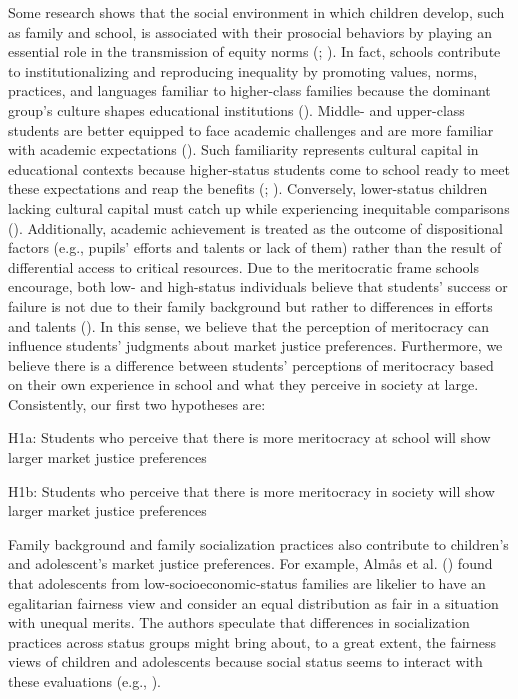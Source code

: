 \documentclass[
  letterpaper,
  DIV=11,
  numbers=noendperiod]{scrartcl}
\begin{document}
Some research shows that the social environment in which children
develop, such as family and school, is associated with their prosocial
behaviors by playing an essential role in the transmission of equity
norms (;
). In
fact, schools contribute to institutionalizing and reproducing
inequality by promoting values, norms, practices, and languages familiar
to higher-class families because the dominant group's culture shapes
educational institutions
().
Middle- and upper-class students are better equipped to face academic
challenges and are more familiar with academic expectations
().
Such familiarity represents cultural capital in educational contexts
because higher-status students come to school ready to meet these
expectations and reap the benefits (; ). Conversely,
lower-status children lacking cultural capital must catch up while
experiencing inequitable comparisons
().
Additionally, academic achievement is treated as the outcome of
dispositional factors (e.g., pupils' efforts and talents or lack of
them) rather than the result of differential access to critical
resources. Due to the meritocratic frame schools encourage, both low-
and high-status individuals believe that students' success or failure is
not due to their family background but rather to differences in efforts
and talents (). In
this sense, we believe that the perception of meritocracy can influence
students' judgments about market justice preferences. Furthermore, we
believe there is a difference between students' perceptions of
meritocracy based on their own experience in school and what they
perceive in society at large. Consistently, our first two hypotheses
are:

H1a: Students who perceive that there is more meritocracy at school will
show larger market justice preferences

H1b: Students who perceive that there is more meritocracy in society
will show larger market justice preferences

Family background and family socialization practices also contribute to
children's and adolescent's market justice preferences. For example,
Almås et al. () found that
adolescents from low-socioeconomic-status families are likelier to have
an egalitarian fairness view and consider an equal distribution as fair
in a situation with unequal merits. The authors speculate that
differences in socialization practices across status groups might bring
about, to a great extent, the fairness views of children and adolescents
because social status seems to interact with these evaluations (e.g.,
).
\end{document}
